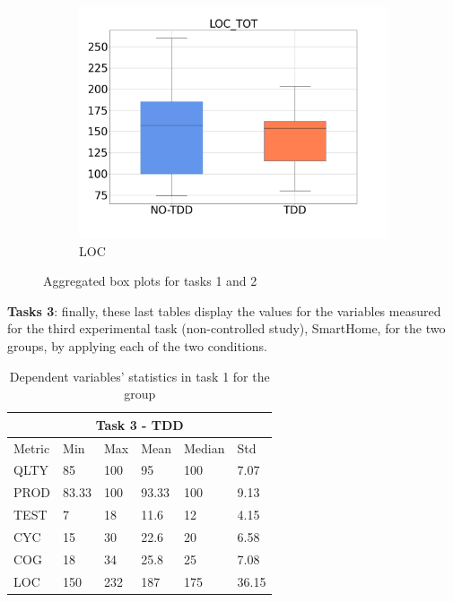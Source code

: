 \begin{figure}[H]
\begin{subfigure}{0.33\textwidth}
        \includegraphics[width=\linewidth]{figures/box_plots/task1_2/LOC.png}
        \caption{LOC}
        \label{bp_task1_2_loc}
    \end{subfigure}
    \caption{Aggregated box plots for tasks 1 and 2}
    \label{fig:box_plots_task1_2}
\end{figure}






\textbf{Tasks 3}: finally, these last tables display the values for the variables measured for the third experimental task (non-controlled study), SmartHome, for the two groups, by applying each of the two conditions.
\begin{table}[!h]
    \begin{center} 
        \begin{tabular}{ |p{2cm}||p{1.6cm}|p{1.6cm}|p{1.6cm}|p{1.6cm}|p{1.6cm}|}
            \hline
                \multicolumn{6}{|c|}{Task 3 - TDD} \\
            \hline
                Metric & Min & Max & Mean & Median & Std\\
            \hline
                QLTY & 85 & 100 & 95 & 100 & 7.07 \\
                PROD & 83.33 & 100 & 93.33 & 100 & 9.13 \\
                TEST & 7 & 18 & 11.6 & 12 & 4.15 \\
                CYC & 15 & 30 & 22.6 & 20 & 6.58 \\
                COG & 18 & 34 & 25.8 & 25 & 7.08 \\
                LOC & 150 & 232 & 187 & 175 & 36.15 \\
            \hline
        \end{tabular}
        \caption{\label{tab_dv_t3_tdd}Dependent variables' statistics in task 1 for the \tdd group}
    \end{center}
\end{table}

